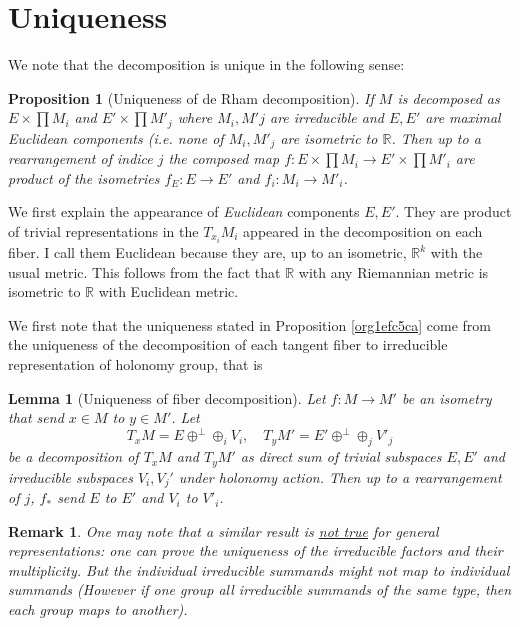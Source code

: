 \documentclass[11pt]{article}
\newtheorem{remark}{Remark}
\newtheorem{lemma}[theorem]{Lemma}
\newtheorem{proposition}{Proposition}[theorem]
\begin{document}
\section{Uniqueness}
\label{sec:org02debfa}
We note that the decomposition is unique in the following sense: 

\begin{proposition}[Uniqueness of de Rham decomposition]
\label{prop:uniqueness}
\label{org1efc5ca}
If \(M\) is decomposed as \(E\times \prod M_i\) and \(E'\times\prod M'_j\) where \(M_i, M'j\) are
irreducible and \(E,E'\) are maximal Euclidean components (i.e. none of \(M_i, M'_j\) are isometric to \(\mathbb{R}\). Then up to a rearrangement of indice \(j\) the composed map \(f: E\times\prod M_i
\longrightarrow E'\times \prod M'_i\) are product of the isometries \(f_E: E\longrightarrow E'\) and
\(f_i:M_i \longrightarrow M'_i\).
\end{proposition}

We first explain the appearance of \emph{Euclidean} components \(E,E'\). They are product of trivial
representations in the \(T_{x_i}M_i\) appeared in the decomposition on each fiber. I call them
Euclidean because they are, up to an isometric, \(\mathbb{R}^k\) with the usual metric. This follows
from the fact that \(\mathbb{R}\) with any Riemannian metric is isometric to \(\mathbb{R}\) with
Euclidean metric.

We first note that the uniqueness stated in Proposition \ref{org1efc5ca} come from the uniqueness of
the decomposition of each tangent fiber to irreducible representation of holonomy group, that is

\begin{lemma}[Uniqueness of fiber decomposition]
\label{lem:uniqueness-fiber}
\label{org995dfdc}
Let \(f: M\longrightarrow M'\) be an isometry that send \(x\in M\) to \(y\in M'\). Let 
\[
T_x M = E \oplus^\perp \oplus_i V_i,\quad T_yM' = E' \oplus^\perp \oplus_j V'_j
\]
be a decomposition of \(T_xM\) and \(T_yM'\) as direct sum of trivial subspaces \(E,E'\) and irreducible
subspaces \(V_i, V_j'\) under holonomy action. Then up to a rearrangement of \(j\), \(f_*\) send \(E\) to
\(E'\) and \(V_i\) to \(V'_i\). 
\end{lemma}

\begin{remark}
One may note that a similar result is \uline{not true} for general representations: one can prove the
uniqueness of the irreducible factors and their multiplicity. But the individual irreducible
summands might not map to individual summands (However if one group all irreducible summands of
the same type, then each group maps to another).
\end{remark}
\end{document}
